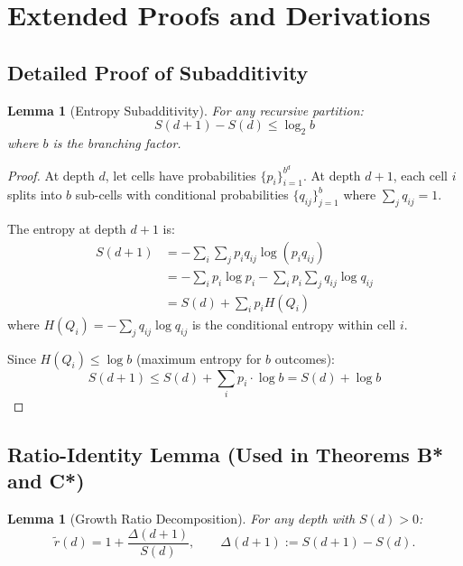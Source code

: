 \documentclass[11pt,a4paper]{article}
\newtheorem{lemma}[theorem]{Lemma}
\theoremstyle{definition}
\theoremstyle{remark}
\newcommand{\rtilde}{\tilde{r}}
\begin{document}
\appendix

\section{Extended Proofs and Derivations}
\label{app:proofs}

\subsection{Detailed Proof of Subadditivity}

\begin{lemma}[Entropy Subadditivity]
\label{lem:subadditivity}
For any recursive partition:
\begin{equation}
    S(d+1) - S(d) \leq \log_2 b
\end{equation}
where $b$ is the branching factor.
\end{lemma}

\begin{proof}
At depth $d$, let cells have probabilities $\{p_i\}_{i=1}^{b^d}$. At depth $d+1$, each cell $i$ splits into $b$ sub-cells with conditional probabilities $\{q_{ij}\}_{j=1}^b$ where $\sum_j q_{ij} = 1$.

The entropy at depth $d+1$ is:
\begin{align}
    S(d+1) &= -\sum_i \sum_j p_i q_{ij} \log(p_i q_{ij}) \\
    &= -\sum_i p_i \log p_i - \sum_i p_i \sum_j q_{ij} \log q_{ij} \\
    &= S(d) + \sum_i p_i H(Q_i)
\end{align}
where $H(Q_i) = -\sum_j q_{ij} \log q_{ij}$ is the conditional entropy within cell $i$.

Since $H(Q_i) \leq \log b$ (maximum entropy for $b$ outcomes):
\begin{equation}
    S(d+1) \leq S(d) + \sum_i p_i \cdot \log b = S(d) + \log b
\end{equation}
\end{proof}

\subsection{Ratio-Identity Lemma (Used in Theorems B* and C*)}

\begin{lemma}[Growth Ratio Decomposition]
For any depth with $S(d)>0$:
\begin{equation}
    \rtilde(d)=1+\frac{\Delta(d+1)}{S(d)}, \qquad \Delta(d+1):=S(d+1)-S(d).
\end{equation}
\end{lemma}
\end{document}
